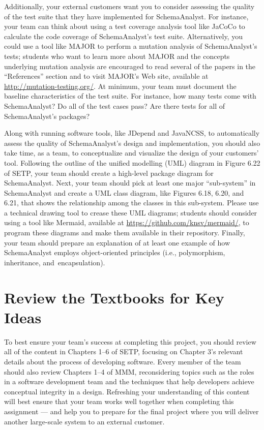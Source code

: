 Additionally, your external customers want you to consider assessing the quality of the test suite that they have
implemented for SchemaAnalyst. For instance, your team can think about using a test coverage analysis tool like JaCoCo
to calculate the code coverage of SchemaAnalyst's test suite. Alternatively, you could use a tool like MAJOR to perform
a mutation analysis of SchemaAnalyst's tests; students who want to learn more about MAJOR and the concepts underlying
mutation analysis are encouraged to read several of the papers in the ``References'' section and to visit MAJOR's Web
site, available at \url{http://mutation-testing.org/}. At minimum, your team must document the baseline characteristics
of the test suite. For instance, how many tests come with SchemaAnalyst? Do all of the test cases pass?  Are there tests
for all of SchemaAnalyst's packages?

Along with running software tools, like JDepend and JavaNCSS, to automatically assess the quality of SchemaAnalyst's
design and implementation, you should also take time, as a team, to conceptualize and visualize the design of your
customers' tool. Following the outline of the unified modelling (UML) diagram in Figure 6.22 of SETP, your team should
create a high-level package diagram for SchemaAnalyst. Next, your team should pick at least one major ``sub-system'' in
SchemaAnalyst and create a UML class diagram, like Figures 6.18, 6.20, and 6.21, that shows the relationship among the
classes in this sub-system. Please use a technical drawing tool to crease these UML diagrams; students should consider
using a tool like Mermaid, available at \url{https://github.com/knsv/mermaid/}, to program these diagrams and make them
available in their repository. Finally, your team should prepare an explanation of at least one example of how
SchemaAnalyst employs object-oriented principles (i.e., polymorphism, inheritance, \mbox{and encapsulation)}.


\section*{Review the Textbooks for Key Ideas}

To best ensure your team's success at completing this project, you should review all of the content in Chapters 1--6 of
SETP, focusing on Chapter 3's relevant details about the process of developing software. Every member of the team should
also review Chapters 1--4 of MMM, reconsidering topics such as the roles in a software development team and the
techniques that help developers achieve conceptual integrity in a design. Refreshing your understanding of this content
will best ensure that your team works well together when completing this assignment --- and help you to prepare for the
final project where you will deliver another large-scale system to an external customer.

